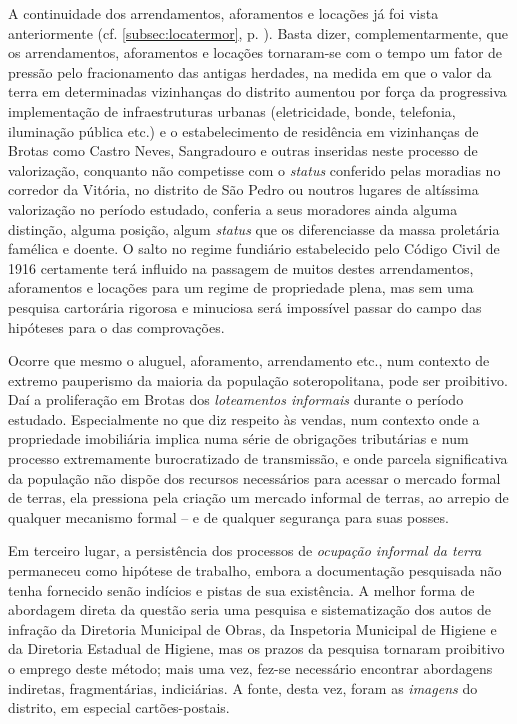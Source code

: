A continuidade dos arrendamentos, aforamentos e locações já foi vista anteriormente (cf. \autoref{subsec:locatermor}, p. \pageref{subsec:locatermor}). Basta dizer, complementarmente, que os arrendamentos, aforamentos e locações tornaram-se com o tempo um fator de pressão pelo fracionamento das antigas herdades, na medida em que o valor da terra em determinadas vizinhanças do distrito aumentou por força da progressiva implementação de infraestruturas urbanas (eletricidade, bonde, telefonia, iluminação pública etc.) e o estabelecimento de residência em vizinhanças de Brotas como Castro Neves, Sangradouro e outras inseridas neste processo de valorização, conquanto não competisse com o \textit{status} conferido pelas moradias no corredor da Vitória, no distrito de São Pedro ou noutros lugares de altíssima valorização no período estudado, conferia a seus moradores ainda alguma distinção, alguma posição, algum \textit{status} que os diferenciasse da massa proletária famélica e doente. O salto no regime fundiário estabelecido pelo Código Civil de 1916 certamente terá influido na passagem de muitos destes arrendamentos, aforamentos e locações para um regime de propriedade plena, mas sem uma pesquisa cartorária rigorosa e minuciosa será impossível passar do campo das hipóteses para o das comprovações.

Ocorre que mesmo o aluguel, aforamento, arrendamento etc., num contexto de extremo pauperismo da maioria da população soteropolitana, pode ser proibitivo. Daí a proliferação em Brotas dos \textit{loteamentos informais} durante o período estudado. Especialmente no que diz respeito às vendas, num contexto onde a propriedade imobiliária implica numa série de obrigações tributárias e num processo extremamente burocratizado de transmissão, e onde parcela significativa da população não dispõe dos recursos necessários para acessar o mercado formal de terras, ela pressiona pela criação um mercado informal de terras, ao arrepio de qualquer mecanismo formal -- e de qualquer segurança para suas posses. 

Em terceiro lugar, a persistência dos processos de \textit{ocupação informal da terra} permaneceu como hipótese de trabalho, embora a documentação pesquisada não tenha fornecido senão indícios e pistas de sua existência. A melhor forma de abordagem direta da questão seria uma pesquisa e sistematização dos autos de infração da Diretoria Municipal de Obras, da Inspetoria Municipal de Higiene e da Diretoria Estadual de Higiene, mas os prazos da pesquisa tornaram proibitivo o emprego deste método; mais uma vez, fez-se necessário encontrar abordagens indiretas, fragmentárias, indiciárias. A fonte, desta vez, foram as \textit{imagens} do distrito, em especial cartões-postais.

